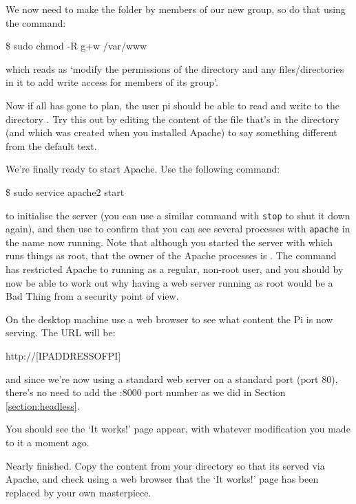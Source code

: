 We now need to make the  folder  by
members of our new group, so do that using the command:

\begin{ttoutenv}
\$ sudo chmod -R g+w /var/www
\end{ttoutenv}

which reads as `modify the permissions of the directory
 and any files/directories in it to add write access
for members of its group'.

Now if all has gone to plan, the user pi should be able to read and
write to the directory . Try this out by editing the
content of the  file that's in the 
directory (and which was created when you installed Apache) to say
something different from the default text.

We're finally ready to start Apache. Use the following command:

\begin{ttoutenv}
\$ sudo service apache2 start
\end{ttoutenv}

to initialise the server (you can use a similar command with
\texttt{stop} to shut it down again), and then use 
to confirm that you can see several processes with \texttt{apache} in
the name now running. Note that although you started the server with
 which runs things as root, that the owner of the
Apache processes is . The  command has restricted Apache to running as a regular,
non-root user, and you should by now be able to work out why having a
web server running as root would be a Bad Thing from a security point
of view.

On the desktop machine use a web browser to see what content the Pi is
now serving. The URL will be:

\begin{ttoutenv}
http://[IPADDRESSOFPI]
\end{ttoutenv}

and since we're now using a standard web server on a standard port
(port 80), there's no need to add the :8000 port number as we did in
Section \ref{section:headless}.

You should see the `It works!' page appear, with whatever modification
you made to it a moment ago.

Nearly finished. Copy the content from your 
directory so that its served via Apache, and check using a web browser
that the `It works!' page has been replaced by your own masterpiece.

